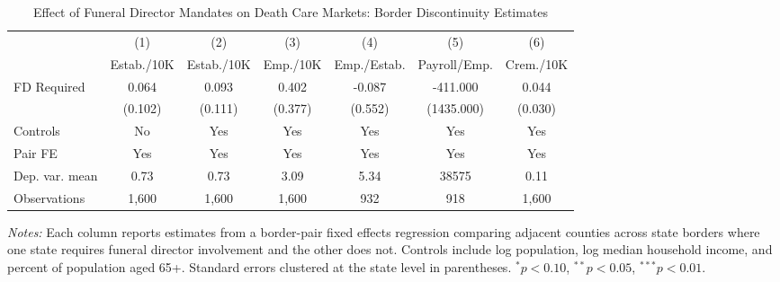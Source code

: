 \begin{table}[t]
\centering
\caption{Effect of Funeral Director Mandates on Death Care Markets: Border Discontinuity Estimates}
\label{tab:main}
\footnotesize
\begin{tabular*}{\textwidth}{@{\extracolsep{\fill}}lcccccc}
\hline\hline
 & (1) & (2) & (3) & (4) & (5) & (6) \\
 & Estab./10K & Estab./10K & Emp./10K & Emp./Estab. & Payroll/Emp. & Crem./10K \\
\hline
\addlinespace
  FD Required & 0.064 & 0.093 & 0.402 & -0.087 & -411.000 & 0.044 \\
  & (0.102) & (0.111) & (0.377) & (0.552) & (1435.000) & (0.030) \\
\addlinespace
  Controls & No & Yes & Yes & Yes & Yes & Yes \\
  Pair FE & Yes & Yes & Yes & Yes & Yes & Yes \\
  Dep. var. mean & 0.73 & 0.73 & 3.09 & 5.34 & 38575 & 0.11 \\
  Observations & 1,600 & 1,600 & 1,600 & 932 & 918 & 1,600 \\
\hline\hline
\end{tabular*}
\parbox{\textwidth}{\footnotesize\sloppy
\textit{Notes:} Each column reports estimates from a border-pair fixed effects regression comparing adjacent counties across state borders where one state requires funeral director involvement and the other does not. Controls include log population, log median household income, and percent of population aged 65+. Standard errors clustered at the state level in parentheses. $^{*}p<0.10$, $^{**}p<0.05$, $^{***}p<0.01$.
}
\end{table}

